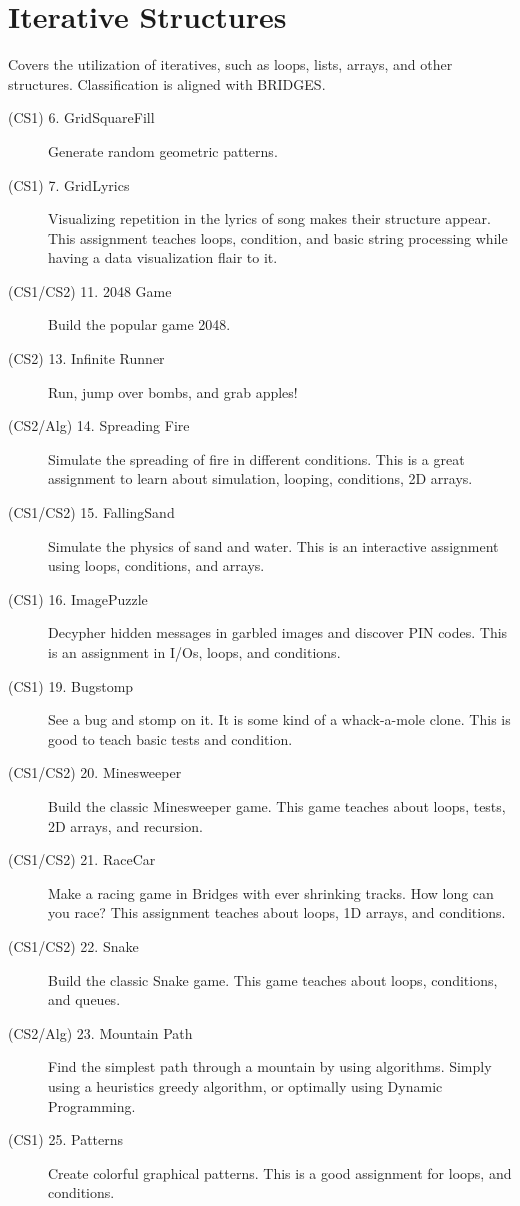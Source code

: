 \documentclass[10pt, onecoulmn]{article}
\begin{document}
\section{Iterative Structures}
Covers the utilization of iteratives, such as loops, lists, arrays, and other structures. Classification is aligned with BRIDGES.
\begin{description}
	\item[(CS1) 6. GridSquareFill] Generate random geometric patterns.
	\item[(CS1) 7. GridLyrics] Visualizing repetition in the lyrics of song makes their structure appear. This assignment teaches loops, condition, and basic string processing while having a data visualization flair to it.
	\item[(CS1/CS2) 11. 2048 Game] Build the popular game 2048.
	\item[(CS2) 13. Infinite Runner] Run, jump over bombs, and grab apples!
	\item[(CS2/Alg) 14. Spreading Fire] Simulate the spreading of fire in different conditions. This is a great assignment to learn about simulation, looping, conditions, 2D arrays.
	\item[(CS1/CS2) 15. FallingSand] Simulate the physics of sand and water. This is an interactive assignment using loops, conditions, and arrays.
	\item[(CS1) 16. ImagePuzzle] Decypher hidden messages in garbled images and discover PIN codes. This is an assignment in I/Os, loops, and conditions.
	\item[(CS1) 19. Bugstomp] See a bug and stomp on it. It is some kind of a whack-a-mole clone. This is good to teach basic tests and condition.
	\item[(CS1/CS2) 20. Minesweeper] Build the classic Minesweeper game. This game teaches about loops, tests, 2D arrays, and recursion.
	\item[(CS1/CS2) 21. RaceCar] Make a racing game in Bridges with ever shrinking tracks. How long can you race? This assignment teaches about loops, 1D arrays, and conditions.
	\item[(CS1/CS2) 22. Snake] Build the classic Snake game. This game teaches about loops, conditions, and queues.
	\item[(CS2/Alg) 23. Mountain Path] Find the simplest path through a mountain by using algorithms. Simply using a heuristics greedy algorithm, or optimally using Dynamic Programming.
	\item[(CS1) 25. Patterns] Create colorful graphical patterns. This is a good assignment for loops, and conditions.

\end{description}
\end{document}
